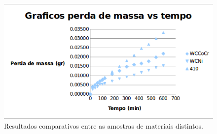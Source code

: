 \begin{figure}
	\centering
	\includegraphics[width=0.8\columnwidth]{method/figs/adequacao/adequacao6.png}
    \caption{Resultados comparativos entre as amostras de materiais distintos.}
    \label{fig:adequacao6}
\end{figure}

